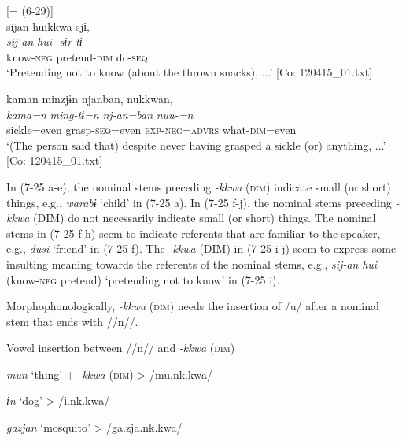 \ex \label{ex:7:25i}  [= (6-29)]\\

\glll  sijan  huikkwa  sjɨ,\\
\textit{sij-an}  \textit{hui-}  \textit{sɨr-tɨ}\\
know-\textsc{neg}  pretend-\textsc{dim}  do-\textsc{seq}\\
\glt ‘Pretending not to know (about the thrown snacks), ...’ [Co: 120415\_01.txt]

\ex \label{ex:7:25j}
\glll  kaman  minzjɨn  njanban,  nukkwan,\footnotemark\\
\textit{kama=n}  \textit{ming-tɨ=n}  \textit{nj-an=ban}  \textit{nuu-=n}\\
sickle=even  grasp-\textsc{seq}=even  \textsc{exp}-\textsc{neg}=\textsc{advrs}  what-\textsc{dim}=even\\
\glt ‘(The person said that) despite never having grasped a sickle (or) anything, ...’ [Co: 120415\_01.txt]
\z
\z

In (7-25 a-e), the nominal stems preceding \textit{{}-kkwa} (\textsc{dim}) indicate small (or short) things, e.g., \textit{warabɨ} ‘child’ in (7-25 a). In (7-25 f-j), the nominal stems preceding \textit{{}-kkwa} (DIM) do not necessarily indicate small (or short) things. The nominal stems in (7-25 f-h) seem to indicate referents that are familiar to the speaker, e.g., \textit{dusi} ‘friend’ in (7-25 f). The \textit{{}-kkwa} (DIM) in (7-25 i-j) seem to express some insulting meaning towards the referents of the nominal stems, e.g., \textit{sij-an} \textit{hui} (know-\textsc{neg} pretend) ‘pretending not to know’ in (7-25 i).

  Morphophonologically, \textit{{}-kkwa} (\textsc{dim}) needs the insertion of /u/ after a nominal stem that ends with //n//.

\ea \label{ex:7:26}  Vowel insertion between //n// and \textit{{}-kkwa} (\textsc{dim})

  \ex  \textit{mun}  ‘thing’  +  \textit{{}-kkwa} (\textsc{dim})  >  /mu.nk.kwa/

  \ex  \textit{ɨn}  ‘dog’      >  /ɨ.nk.kwa/

  \ex  \textit{gazjan}  ‘mosquito’      >  /ga.zja.nk.kwa/
\z
\z


